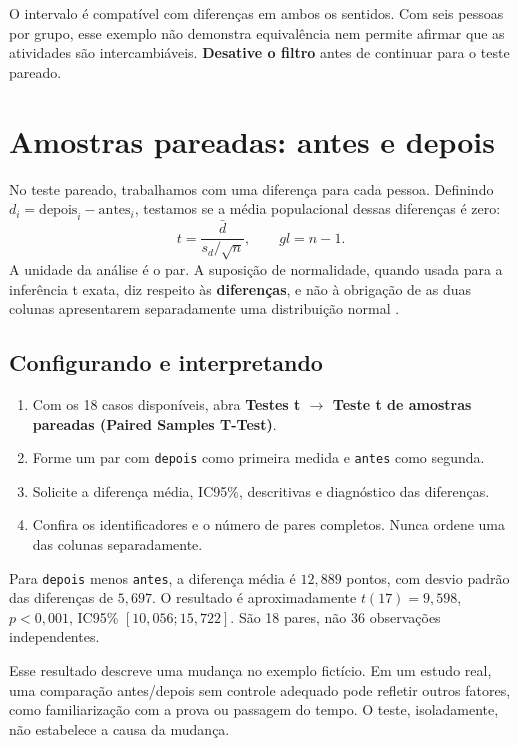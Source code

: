O intervalo é compatível com diferenças em ambos os sentidos. Com seis pessoas por grupo, esse exemplo não demonstra equivalência nem permite afirmar que as atividades são intercambiáveis. \textbf{Desative o filtro} antes de continuar para o teste pareado.

\section{Amostras pareadas: antes e depois}

No teste pareado, trabalhamos com uma diferença para cada pessoa. Definindo $d_i=\text{depois}_i-\text{antes}_i$, testamos se a média populacional dessas diferenças é zero:
\[
t=\frac{\bar{d}}{s_d/\sqrt{n}},\qquad gl=n-1.
\]
A unidade da análise é o par. A suposição de normalidade, quando usada para a inferência t exata, diz respeito às \textbf{diferenças}, e não à obrigação de as duas colunas apresentarem separadamente uma distribuição normal \parencite{JamoviTPareado}.

\subsection{Configurando e interpretando}

\begin{enumerate}
  \item Com os 18 casos disponíveis, abra \textbf{Testes t $\rightarrow$ Teste t de amostras pareadas (Paired Samples T-Test)}.
  \item Forme um par com \texttt{depois} como primeira medida e \texttt{antes} como segunda.
  \item Solicite a diferença média, IC95\%, descritivas e diagnóstico das diferenças.
  \item Confira os identificadores e o número de pares completos. Nunca ordene uma das colunas separadamente.
\end{enumerate}

Para \texttt{depois} menos \texttt{antes}, a diferença média é $12{,}889$ pontos, com desvio padrão das diferenças de $5{,}697$. O resultado é aproximadamente $t(17)=9{,}598$, $p<0{,}001$, IC95\% $[10{,}056;15{,}722]$. São 18 pares, não 36 observações independentes.

Esse resultado descreve uma mudança no exemplo fictício. Em um estudo real, uma comparação antes/depois sem controle adequado pode refletir outros fatores, como familiarização com a prova ou passagem do tempo. O teste, isoladamente, não estabelece a causa da mudança.

